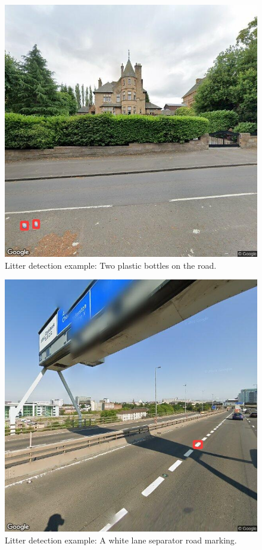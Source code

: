 \documentclass{thesis}
\begin{document}
\begin{appendices}
\begin{figure}[h!]
    \centering
    \includegraphics[scale=0.375]{images/good-two-bottles.jpg}
    \caption{Litter detection example: Two plastic bottles on the road.}
\end{figure}

\begin{figure}[h]
    \centering
    \includegraphics[scale=0.45]{images/flaw-road-marking.jpg}
    \caption{Litter detection example: A white lane separator road marking.}
\end{figure}


\end{appendices}
\end{document}

